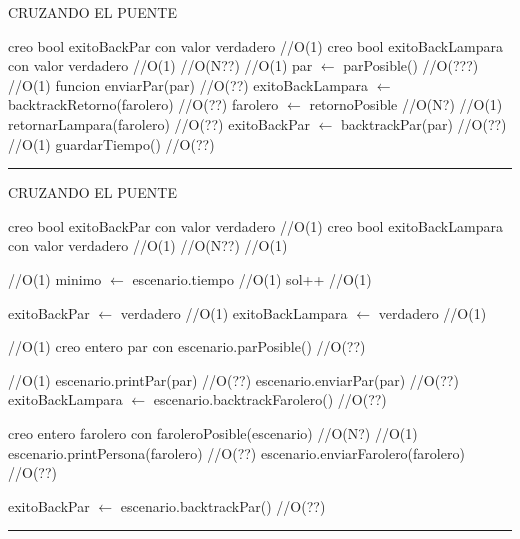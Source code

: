 \begin{algorithm}[H]
\caption{CRUZANDO EL PUENTE}
\begin{algorithmic}[1]
\state creo bool exitoBackPar con valor verdadero \hfill //O(1)
\state creo bool exitoBackLampara con valor verdadero \hfill //O(1)
 \hfill //O(N??)
 \hfill //O(1)
\state par $\gets$ parPosible() \hfill //O(???)
 \hfill //O(1)
\state funcion enviarPar(par) \hfill //O(??)
\Else
\state exitoBackLampara $\gets$ backtrackRetorno(farolero) \hfill //O(??)
\endif
\Else
\state farolero $\gets$ retornoPosible \hfill //O(N?)
 \hfill //O(1)
\state retornarLampara(farolero) \hfill //O(??)
\Else
\state exitoBackPar $\gets$ backtrackPar(par) \hfill //O(??)
\endif
\endif
{} \hfill //O(1)
\state guardarTiempo() \hfill //O(??)
\endif
\endwhile
\EndFunction 
\end{algorithmic}
\hrule
{}
\end{algorithm}


\begin{algorithm}[H]
\caption{CRUZANDO EL PUENTE}
\begin{algorithmic}[1]
\state creo bool exitoBackPar con valor verdadero \hfill //O(1)
\state creo bool exitoBackLampara con valor verdadero \hfill //O(1)
 \hfill //O(N??)
 \hfill //O(1)

 \hfill //O(1)
\state minimo $\gets$ escenario.tiempo \hfill //O(1)
\endif
\state sol++  \hfill //O(1)
\endif

\state exitoBackPar $\gets$ verdadero \hfill //O(1)
\state exitoBackLampara $\gets$ verdadero \hfill //O(1)

 \hfill //O(1)
\state creo entero par con escenario.parPosible() \hfill //O(??)

 \hfill //O(1)
\state escenario.printPar(par) \hfill //O(??)
\state escenario.enviarPar(par) \hfill //O(??)
\Else
\state exitoBackLampara $\gets$ escenario.backtrackFarolero() \hfill //O(??)
\endif


\Else
\state creo entero farolero con faroleroPosible(escenario) \hfill //O(N?)
 \hfill //O(1)
\state escenario.printPersona(farolero) \hfill //O(??)
\state escenario.enviarFarolero(farolero) \hfill //O(??)

\Else
\state exitoBackPar $\gets$ escenario.backtrackPar() \hfill //O(??)
\endif
\endif
\endwhile
\EndFunction 
\end{algorithmic}
\hrule
{}
\end{algorithm}





